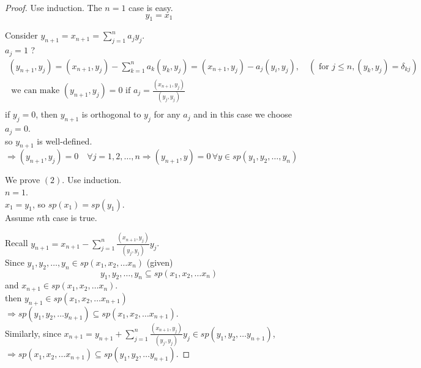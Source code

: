 \documentclass[twoside]{amsart}
\theoremstyle{plain}
\theoremstyle{definition}
\begin{document}
\begin{proof}
  Use induction.  The $n=1$ case is easy. 
  \[
  y_1 = x_1
  \]

  Consider $y_{n+1} = x_{n+1} = \sum_{j=1}^n a_j y_j$.  \\
  \phantom{Consi} $a_j = 1$ ? \\
  \begin{gather*}
    (y_{n+1},y_j) = (x_{n+1},y_j) - \sum_{k=1}^n a_k (y_k, y_j) = (x_{n+1},y_j) - a_j(y_i,y_j), \quad (\text{ for } j \leq n , (y_k,y_j) = \delta_{kj} ) \\
    \text{ we can make } (y_{n+1}, y_j) = 0 \text{ if } a_{j} = \frac{(x_{n+1},y_j)}{ (y_j,y_j) } \\
  \end{gather*}
  \phantom{Consi} if $y_j = 0 $, then $y_{n+1}$ is orthogonal to $y_j$ for any $a_j$ and in this case we choose $a_j = 0$.  \\
  \phantom{Consider} so $y_{n+1}$ is well-defined.  \\
  $\Longrightarrow (y_{n+1}, y_j) = 0 \quad \forall j =1,2, \dots , n \Longrightarrow (y_{n+1}, y )= 0 \, \forall y \in sp(  y_1,y_2, \dots , y_n )$

  We prove $(2)$.  Use induction. \\
  $n=1$.  \\
  \phantom{n 1} $x_1 = y_1 $, so $sp(x_1) = sp(y_1) $.  \\

  Assume $n$th case is true.
  
  Recall $y_{n+1} = x_{n+1} - \sum_{j=1}^n \frac{ (x_{n+1},y_j) }{ (y_j, y_j)} y_j $.\\  
  Since $y_1,y_2, \dots , y_n \in sp(x_1, x_2, \dots x_n ) $ (given)\\
  \[
  y_1,y_2, \dots , y_n \subseteq sp(x_1, x_2, \dots x_n )
  \]
  and $x_{n+1} \in sp(x_1,x_2, \dots x_n) $. \\
  \phantom{and} then $y_{n+1} \in sp(x_1,x_2, \dots x_{n+1} ) $ \\
  $\Longrightarrow sp(y_1,y_2, \dots y_{n+1} ) \subseteq sp(x_1,x_2, \dots x_{n+1} )$.  \bigskip \\
  Similarly, since $x_{n+1} = y_{n+1} + \sum_{j=1}^n \frac{ (x_{n+1},y_j) }{ (y_j, y_j)} y_j \in sp(y_1,y_2, \dots y_{n+1}) $, \\
  $\Longrightarrow sp(x_1,x_2, \dots x_{n+1} ) \subseteq sp(y_1,y_2, \dots y_{n+1} )$.
  

\end{proof}
\end{document}
